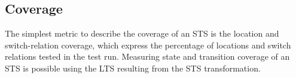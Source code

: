 \subsection{Coverage}\label{sec:sts_coverage}
The simplest metric to describe the coverage of an STS is the location and switch-relation coverage, which express the percentage of locations and switch relations tested in the test run. Measuring state and transition coverage of an STS is possible using the LTS resulting from the STS transformation. \begin{comment}However, this metric is not always useful, because the number of states and transitions in the LTS depend on the number of unique combinations of concrete values of the variables in the STS. This is potentially very large. For example, when the guards of the switch relations in Figure~\ref{fig:trafo_sts} are removed, the transformation leads to an LTS with a state and transition for each possible value of an integer. It is often infeasable to test every data value in the STS. The most interesting data values to test can be found by \textit{boundary-value analysis} and \textit{equivalence partitioning}. This technique divides data value ranges into representative partitions and tests the minimum and maximum values for each partition. For an in-depth explanation of these terms we refer to~\cite{Myers:2004}. We refer to Reid~\cite{Reid:partitioning} for an effectiveness study of these techniques in fault detection. The equivalence partitions in Figure~\ref{fig:example_sts} for $d$ are $(-\infty..0), (1..6)$ and $(7..\infty)$. The minimum and maximum values in each of these ranges are tested when using boundary-value analysis.\marginpar{Dit nog even skippen, moeten kijken wat hiervan nodig is later}

\textit{Data coverage} expresses the percentage of data tested in the test run, considering data to be similar if located in the same partition and a better representative of the partition if located close to the partition boundary. These properties of the tested data affect the data coverage percentage.\end{comment}
